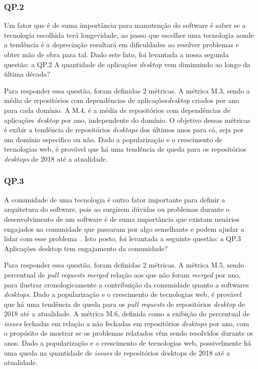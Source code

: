 \documentclass[12pt]{article}
\begin{document}
\subsubsection{QP.2}

Um fator que é de suma importância para manutenção do software é saber se a tecnologia escolhida terá longevidade, ao passo que escolher uma tecnologia aonde a tendência é a depreciação resultará em dificuldades ao resolver problemas e obter mão de obra para tal. Dado este fato, foi levantada a nossa segunda questão: a QP.2 A quantidade de aplicações \textit{desktop} vem diminuindo ao longo da última década?

Para responder essa questão, foram definidas 2 métricas. A métrica M.3, sendo a média de repositórios com dependências de aplicações\textit{desktop} criados por ano para cada domínio. A M.4, é a média de repositórios com dependências de aplicações \textit{desktop} por ano, independente do domínio. O objetivo dessas métricas é exibir a tendência de repositórios \textit{desktops} dos últimos anos para cá, seja por um domínio específico ou não. Dado a popularização e o crescimento de tecnologias web, é provável que há uma tendência de queda para os repositórios \textit{desktops} de 2018 até a atualidade.

\subsubsection{QP.3}

A comunidade de uma tecnologia é outro fator importante para definir a arquitetura do software, pois ao surgirem dúvidas ou problemas durante o desenvolvimento de um software é de suma importância que existam usuários engajados na comunidade que passaram por algo semelhante e podem ajudar a lidar com esse problema~\cite{9282287}. Isto posto, foi levantada a seguinte questão: a QP.3 Aplicações desktop tem engajamento da comunidade? 
 
Para responder essa questão, foram definidas 2 métricas. A métrica M.5, sendo percentual de \textit{pull requests merged} relação aos que não foram \textit{merged} por ano, para ilustrar cronologicamente a contribuição da comunidade quanto a softwares \textit{desktops}. Dado a popularização e o crescimento de tecnologias web, é provável que há uma tendência de queda para os \textit{pull requests} de repositórios \textit{desktop} de 2018 até a atualidade. A métrica M.6, definida como a exibição do percentual de \textit{issues} fechadas em relação a não fechadas em repositórios \textit{desktops} por ano, com o propósito de mostrar se os problemas relatados vêm sendo resolvidos durante os anos. Dado a popularização e o crescimento de tecnologias web, possivelmente há uma queda na quantidade de \textit{issues} de repositórios desktops de 2018 até a atualidade.
\end{document}
